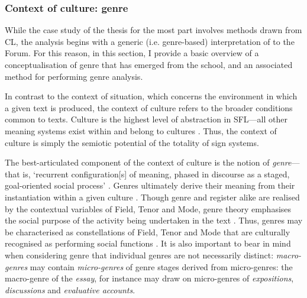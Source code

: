 


\subsubsection{Context of culture: genre} \label{sect:genre}

While the case study of the thesis for the most part involves methods drawn from \gls{CL}, the analysis begins with a generic (i.e. genre\hyp{}based) interpretation of  to the \gls{Forum}. For this reason, in this section, I provide a basic overview of a conceptualisation of genre that has emerged from the  school, and an associated method for performing genre analysis.



In contrast to the context of situation, which concerns the environment in which a given text is produced, the context of culture refers to the broader conditions common to texts. Culture is the highest level of abstraction in \gls{SFL}---all other meaning systems exist within and belong to cultures \cite{halliday_language_1989}. Thus, the context of culture is simply the semiotic potential of the totality of sign systems. 

The best\hyp{}articulated component of the context of culture is the notion of \emph{genre}---that is, `recurrent configuration[s] of meaning, phased in discourse as a staged, goal-oriented social process' \cite[p.~9]{martin_genre-based_2013}. Genres ultimately derive their meaning from their instantiation within a given culture \cite[p.~99]{halliday_language_1989}. Though genre and register alike are realised by the contextual variables of Field, Tenor and Mode, genre theory emphasises the social purpose of the activity being undertaken in the text \cite{christie_genre_2005,martin_english_1992}. Thus, genres may be characterised as constellations of Field, Tenor and Mode that are culturally recognised as performing social functions \cite{eggins_introduction_2004}. It is also important to bear in mind when considering genre that individual genres are not necessarily distinct: \emph{macro-genres} may contain \emph{micro-genres} of genre stages derived from micro-genres: the macro-genre of the \emph{essay}, for instance may draw on micro-genres of \emph{expositions}, \emph{discussions} and \emph{evaluative accounts}.

